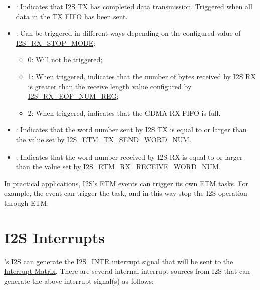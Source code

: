 \documentclass[main\_\_EN.tex]{subfiles}
\begin{document}
\begin{itemize}
    \item \label{evt:I2SEVTTXDONE}: Indicates that I2S TX has completed data transmission. Triggered when all data in the TX FIFO has been sent.
    \item \label{evt:I2SEVTRXDONE}: Can be triggered in different ways depending on the configured value of \hyperref[fielddesc:I2SRXSTOPMODE]{I2S\_RX\_STOP\_MODE}:
    \begin{itemize}
        \item 0: Will not be triggered;
        \item 1: When triggered, indicates that the number of bytes received by I2S RX is greater than the receive length value configured by \hyperref[regdesc:I2SRXEOFNUMREG]{I2S\_RX\_EOF\_NUM\_REG};
        \item 2: When triggered, indicates that the GDMA RX FIFO is full.
    \end{itemize}
    \item \label{evt:I2SEVTXWORDSSENT}: Indicates that the word number sent by I2S TX is equal to or larger than the value set by \hyperref[fielddesc:I2SETMTXSENDWORDNUM]{I2S\_ETM\_TX\_SEND\_WORD\_NUM}.
    \item \label{evt:I2SEVTXWORDSRECEIVED}: Indicates that the word number received by I2S RX is equal to or larger than the value set by \hyperref[fielddesc:I2SETMRXRECEIVEWORDNUM]{I2S\_ETM\_RX\_RECEIVE\_WORD\_NUM}.
\end{itemize}

In practical applications, I2S's ETM events can trigger its own ETM tasks. For example, the  event can trigger the  task, and in this way stop the I2S operation through ETM.


\section{I2S Interrupts} \label{sec:i2s-interrupts}

\chipname{}'s I2S can generate the I2S\_INTR interrupt signal that will be sent to the \hyperref[mod:intmtrx]{Interrupt Matrix}. There are several internal interrupt sources from I2S  that can generate the above interrupt signal(s) as follows:
\end{document}
